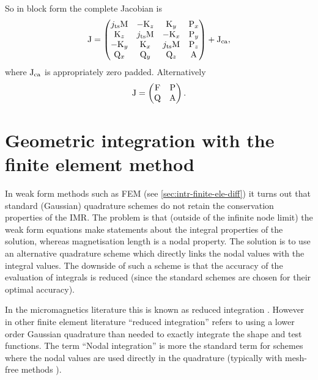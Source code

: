 So in block form the complete Jacobian is
\begin{equation}
  \mathrm{J} =
  \begin{pmatrix}
    j_\text{ts} \mathrm{M}    & -\mathrm{K}_z       & \mathrm{K}_y      & \mathrm{P}_x \\
    \mathrm{K}_z         & j_\text{ts}\mathrm{M}    & -\mathrm{K}_x     & \mathrm{P}_y \\
    -\mathrm{K}_y        & \mathrm{K}_x      & j_\text{ts} \mathrm{M} & \mathrm{P}_z \\
    \mathrm{Q}_x       & \mathrm{Q}_y      & \mathrm{Q}_z    & \mathrm{A}     \\
  \end{pmatrix} + \mathrm{J}_\text{ca},
\end{equation}
where $\mathrm{J}_\text{ca}$ is appropriately zero padded.
Alternatively
\begin{equation}
\mathrm{J} =
  \begin{pmatrix}
    \mathrm{F}   & \mathrm{P} \\
    \mathrm{Q}   & \mathrm{A} \\
  \end{pmatrix}.
\end{equation}



\section{Geometric integration with the finite element method}
\label{sec:nodal-integration}


In weak form methods such as FEM (see \autoref{sec:intr-finite-ele-diff}) it turns out that standard (\ie Gaussian) quadrature schemes do not retain the conservation properties of the IMR.
The problem is that (outside of the infinite node limit) the weak form equations make statements about the integral properties of the solution, whereas magnetisation length is a nodal property.
The solution is to use an alternative quadrature scheme which directly links the nodal values with the integral values.
The downside of such a scheme is that the accuracy of the evaluation of integrals is reduced (since the standard schemes are chosen for their optimal accuracy).

In the micromagnetics literature this is known as reduced integration \cite{Cimrak2008}.
However in other finite element literature ``reduced integration'' refers to using a lower order Gaussian quadrature than needed to exactly integrate the shape and test functions.
The term ``Nodal integration'' is more the standard term for schemes where the nodal values are used directly in the quadrature (typically with mesh-free methods \eg \cite{Puso2008}).

